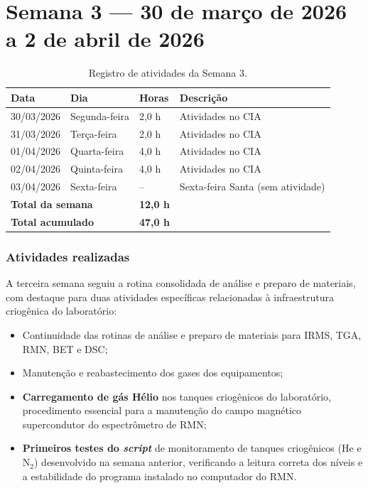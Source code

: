 
\section{Semana 3 --- 30 de março de 2026 a 2 de abril de 2026}

\begin{table}[H]
\centering
\caption{Registro de atividades da Semana 3.}
\begin{tabular}{llll}
\toprule
\textbf{Data} & \textbf{Dia} & \textbf{Horas} & \textbf{Descrição} \\
\midrule
30/03/2026 & Segunda-feira & 2,0 h & Atividades no CIA \\
31/03/2026 & Terça-feira & 2,0 h & Atividades no CIA \\
01/04/2026 & Quarta-feira & 4,0 h & Atividades no CIA \\
02/04/2026 & Quinta-feira & 4,0 h & Atividades no CIA \\
03/04/2026 & Sexta-feira & -- & Sexta-feira Santa (sem atividade) \\
\midrule
\multicolumn{2}{l}{\textbf{Total da semana}} & \textbf{12,0 h} & \\
\multicolumn{2}{l}{\textbf{Total acumulado}} & \textbf{47,0 h} & \\
\bottomrule
\end{tabular}
\end{table}

\subsubsection*{Atividades realizadas}

A terceira semana seguiu a rotina consolidada de análise e preparo de
materiais, com destaque para duas atividades específicas relacionadas à
infraestrutura criogênica do laboratório:

\begin{itemize}
    \item Continuidade das rotinas de análise e preparo de materiais para
          IRMS, TGA, RMN, BET e DSC;
    \item Manutenção e reabastecimento dos gases dos equipamentos;
    \item \textbf{Carregamento de gás Hélio} nos tanques criogênicos do
          laboratório, procedimento essencial para a manutenção do campo
          magnético supercondutor do espectrômetro de RMN;
    \item \textbf{Primeiros testes do \textit{script}} de monitoramento de
          tanques criogênicos (He e $\text{N}_2$) desenvolvido na semana
          anterior, verificando a leitura correta dos níveis e a
          estabilidade do programa instalado no computador do RMN.
\end{itemize}

